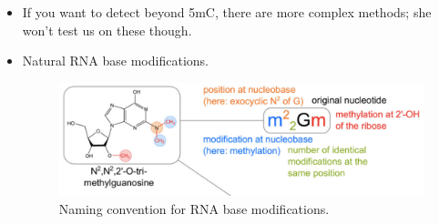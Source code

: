 \documentclass[../notes.tex]{subfiles}
\begin{document}
\begin{itemize}
\begin{figure}[h!]
        \label{fig:bisulfite}
    \end{figure}
    \begin{itemize}
        \item Bisulfite chemistry.
        \begin{itemize}
            \item One of Tang's favorite topics in biochemistry; will definitely be tested.
        \end{itemize}
        \item When you mix DNA with bisulfite and heat it up, cytosine converts to uracil. Since uracil pairs with thymine, you will detect thymine when you should detect guanine if you do the bisulfite treatment.
        \item If you have 5mC, bisulfite won't attack for steric reasons, so 5mC remains unchanged.
        \item Thus, between the original strand and the bisufited strand, you get differentiation.
        \item Whichever cytosines don't change before and after bisulfiting are your methylated C's.
        \begin{itemize}
            \item Notice how in Figure \ref{fig:bisulfite}, the only cytosine which doesn't change in between the two rounds of sequencing is the methylated one, indicated in bright red.
        \end{itemize}
        \item Assuming the reaction yield of bisulfite chemistry is 100\%. What if the yield is 50\%? We are lucky here: Bisulfite chemistry is 99.9\% efficient, so the number of false positives is very low.
    \end{itemize}
    \item If you want to detect beyond 5mC, there are more complex methods; she won't test us on these though.
    \item Natural RNA base modifications.
    \begin{figure}[h!]
        \centering
        \includegraphics[width=0.7\linewidth]{../ExtFiles/RNAbaseModName.png}
        \caption{Naming convention for RNA base modifications.}
        \label{fig:RNAbaseModName}

\end{figure}
\end{itemize}
\end{document}
